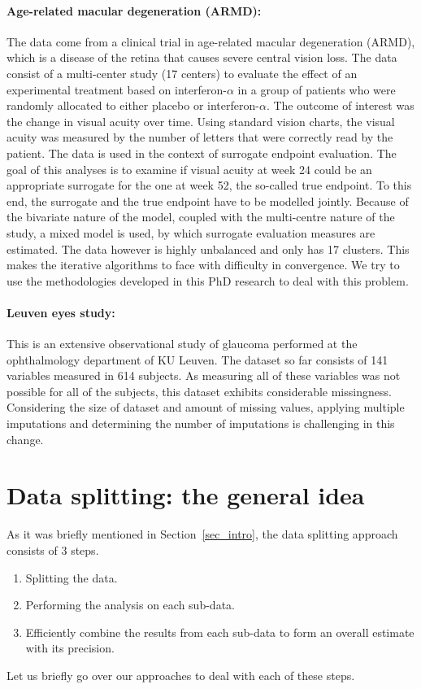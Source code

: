 \documentclass[14pt]{article}
\begin{document}
\paragraph*{Age-related macular degeneration (ARMD):} The data come from a clinical trial in age-related macular degeneration (ARMD), which is a disease of the retina that causes severe central vision loss. The data consist of a multi-center study (17 centers) to evaluate the effect of an experimental treatment based on interferon-$\alpha$ in a group of patients who were randomly allocated to either placebo or interferon-$\alpha$. The outcome of interest was the change in visual acuity over time. Using standard vision charts, the visual acuity was measured by the number of letters that were correctly read by the patient. The data is used in the context of surrogate endpoint evaluation. The goal of this analyses is to examine if  visual acuity at week 24 could be an appropriate surrogate for the one at week 52, the so-called true endpoint. To this end, the surrogate and the true endpoint have to be modelled jointly. Because of the bivariate nature of the model, coupled with the multi-centre nature of the study, a mixed model is used, by which surrogate evaluation measures are estimated. The data however is highly unbalanced and only has 17 clusters. This makes the iterative algorithms to face with difficulty in convergence. We try to use the methodologies developed in this PhD research to deal with this problem.

\paragraph*{Leuven eyes study:} This is an extensive observational study of glaucoma performed at the ophthalmology department of KU Leuven. The dataset so far consists of 141 variables measured in 614 subjects. As measuring all of these variables was not possible for all of the subjects, this dataset exhibits considerable missingness. Considering the size of dataset and amount of missing values, applying multiple imputations and determining the number of imputations is challenging in this change. 

\section{Data splitting: the general idea}
\label{sec_idea}
As it was briefly mentioned in Section~\ref{sec_intro}, the data splitting approach consists of 3 steps.
\begin{enumerate}
\item Splitting the data.
\item Performing the analysis on each sub-data.
\item Efficiently combine the results from each sub-data to form an overall estimate with its precision.
\end{enumerate}
Let us briefly go over our approaches to deal with each of these steps. 
\end{document}
